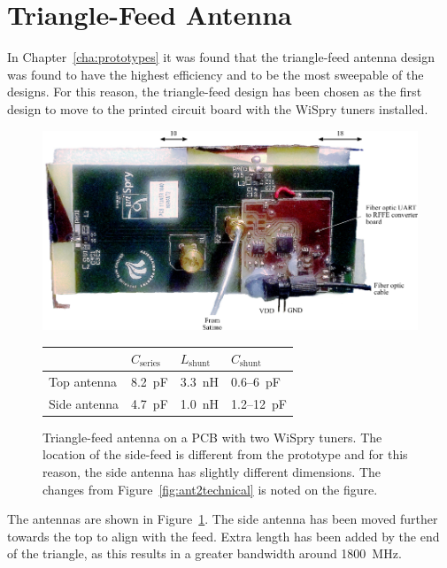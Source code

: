 \section{Triangle-Feed Antenna}

In Chapter~\ref{cha:prototypes} it was found that the triangle-feed antenna design was found to have the highest efficiency and to be the most sweepable of the designs. For this reason, the triangle-feed design has been chosen as the first design to move to the printed circuit board with the WiSpry tuners installed. 

\begin{figure}[htbp]
    \centering
    \includegraphics{img/tech_sol/pcb_trianglefeed/pcb_enh}\\[2em]
    \footnotesize
    \begin{tabular}{|l|l|l|l|}
        \hline
        & $C_{\text{series}}$ & $L_{\text{shunt}}$ & $C_{\text{shunt}}$ \\
        \hline
        Top antenna & \SI{8.2}{pF} & \SI{3.3}{nH} & 0.6--\SI{6}{pF} \\
        Side antenna & \SI{4.7}{pF} & \SI{1.0}{nH} & 1.2--\SI{12}{pF} \\
        \hline
    \end{tabular}
    \caption{Triangle-feed antenna on a PCB with two WiSpry tuners. The location of the side-feed is different from the prototype and for this reason, the side antenna has slightly different dimensions. The changes from Figure~\ref{fig:ant2technical} is noted on the figure.}
    \label{fig:triang_pcb_enh}
\end{figure}

The antennas are shown in Figure~\ref{fig:triang_pcb_enh}. The side antenna has been moved further towards the top to align with the feed. Extra length has been added by the end of the triangle, as this results in a greater bandwidth around \SI{1800}{MHz}.


